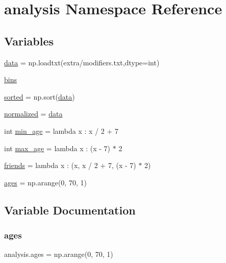 \hypertarget{namespaceanalysis}{}\section{analysis Namespace Reference}
\label{namespaceanalysis}
\subsection*{Variables}
\begin{DoxyCompactItemize}
\item 
\hyperlink{namespaceanalysis_a8e5c6c55793a8249397435e05eda6968}{data} = np.\+loadtxt(\textquotesingle{}extra/modifiers.\+txt\textquotesingle{},dtype=int)
\item 
\hyperlink{namespaceanalysis_adc97b0bb2eb4faef2ffafdd8f97d570c}{bins}
\item 
\hyperlink{namespaceanalysis_a934e8d3fbae69a78e33082cd334ddd8f}{sorted} = np.\+sort(\hyperlink{namespaceanalysis_a8e5c6c55793a8249397435e05eda6968}{data})
\item 
\hyperlink{namespaceanalysis_aec60410ab6085372fae7c69411236723}{normalized} = \hyperlink{namespaceanalysis_a8e5c6c55793a8249397435e05eda6968}{data}
\item 
int \hyperlink{namespaceanalysis_a3ad26cf6e63a9177bcfa833db4203551}{min\+\_\+age} = lambda x \+: x / 2 + 7
\item 
int \hyperlink{namespaceanalysis_aa184091b9b0bb61ce0703af5724396e6}{max\+\_\+age} = lambda x \+: (x -\/ 7) $\ast$ 2
\item 
\hyperlink{namespaceanalysis_acb3550b22490c4bc34ebaf31cdcc9cc4}{friends} = lambda x \+: (x, x / 2 + 7, (x -\/ 7) $\ast$ 2)
\item 
\hyperlink{namespaceanalysis_a28ba92b43bf20be8dd2d6aa65295c190}{ages} = np.\+arange(0, 70, 1)
\end{DoxyCompactItemize}


\subsection{Variable Documentation}
\mbox{\label{namespaceanalysis_a28ba92b43bf20be8dd2d6aa65295c190}} 
\subsubsection{\texorpdfstring{ages}{ages}}
{\footnotesize\ttfamily analysis.\+ages = np.\+arange(0, 70, 1)}

